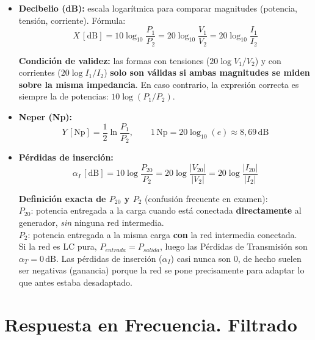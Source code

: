\documentclass[12pt,a4paper]{article}
\begin{document}
\begin{itemize}[leftmargin=1.5em, itemsep=6pt]

  \item \textbf{Decibelio (dB):} escala logarítmica para comparar magnitudes (potencia, tensión, corriente). Fórmula:
  \[
    X\,[\text{dB}] = 10\log_{10}\!\frac{P_1}{P_2}
    = 20\log_{10}\!\frac{V_1}{V_2} = 20\log_{10}\!\frac{I_1}{I_2}
  \]
  \begin{warnbox}
  \textbf{\color{warnorangeline}Condición de validez:} las formas con tensiones
  ($20\log V_1/V_2$) y con corrientes ($20\log I_1/I_2$) \textbf{solo son válidas si
  ambas magnitudes se miden sobre la misma impedancia}. En caso contrario, la
  expresión correcta es siempre la de potencias: $10\log(P_1/P_2)$.
  \end{warnbox}

  \item \textbf{Neper (Np):}
  \[
    Y\,[\text{Np}] = \frac{1}{2}\ln\frac{P_1}{P_2},
    \qquad 1\,\text{Np} = 20\log_{10}(e) \approx 8{,}69\,\text{dB}
  \]

  \item \textbf{Pérdidas de inserción:}
  \[
    \alpha_I\,[\text{dB}]
    = 10\log\frac{P_{20}}{P_2}
    = 20\log\frac{|V_{20}|}{|V_2|}
    = 20\log\frac{|I_{20}|}{|I_2|}
  \]

  \begin{warnbox}
  \textbf{\color{warnorangeline}Definición exacta de $P_{20}$ y $P_2$}
  (confusión frecuente en examen):\\[4pt]
  \quad $P_{20}$: potencia entregada a la carga cuando está conectada
  \textbf{directamente} al generador, \emph{sin} ninguna red intermedia.\\
  \quad $P_2$: potencia entregada a la misma carga \textbf{con} la red intermedia
  conectada.\\[4pt]
  Si la red es LC pura, $P_{entrada} = P_{salida}$, luego las Pérdidas de
  Transmisión son $\alpha_T = 0\,\text{dB}$. Las pérdidas de inserción ($\alpha_I$)
  casi nunca son 0, de hecho suelen ser negativas (ganancia) porque la red se
  pone precisamente para adaptar lo que antes estaba desadaptado.
  \end{warnbox}

\end{itemize}
\clearpage %
\section{Respuesta en Frecuencia. Filtrado}
\end{document}
